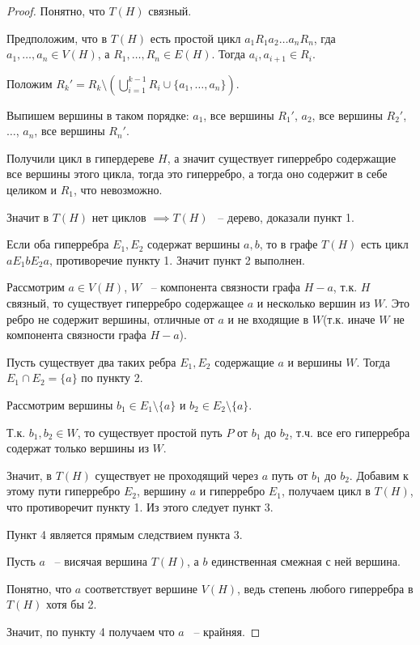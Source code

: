 \documentclass[../main.tex]{subfiles}
\begin{document}
\begin{proof}
	Понятно, что $T(H)$ связный.

	Предположим, что в $T(H)$ есть простой цикл $a_1 R_1 a_2 \ldots a_n R_n$, гда $a_1, \ldots, a_n \in V(H)$, а $R_1, \ldots, R_n \in E(H)$.
	Тогда $a_i, a_{i + 1} \in R_i$.

	Положим  $R_k' = R_k \setminus\left(\bigcup_{i = 1}^{k - 1} R_i \cup \{a_1, \ldots, a_n\}\right)$.

	Выпишем вершины в таком порядке: $a_1$, все вершины $R_1'$,  $a_2$, все вершины $R_2'$,  $\dots$,  $a_n$, все вершины  $R_n'$.

	Получили цикл в гипердереве  $H$, а значит существует гиперребро содержащие все вершины этого цикла, тогда это гиперребро, а тогда оно содержит в себе целиком и $R_1$, что невозможно.

	Значит в  $T(H)$ нет циклов  $\implies T(H)$ ~-- дерево, доказали пункт 1.

	Если оба гиперребра  $E_1, E_2$ содержат вершины $a, b$, то в графе  $T(H)$ есть цикл  $a E_1 b E_2 a$, противоречие пункту 1. Значит пункт 2 выполнен.

	Рассмотрим $a \in V(H)$, $W$ ~-- компонента связности графа $H - a$, т.к. $H$ связный, то существует гиперребро содержащее $a$ и несколько вершин из $W$.
	Это ребро не содержит вершины, отличные от $a$ и не входящие в $W$(т.к. иначе $W$ не компонента связности графа $H - a$).

	Пусть существует два таких ребра $E_1, E_2$ содержащие $a$ и вершины $W$.
	Тогда  $E_1 \cap E_2 = \{a\}$ по пункту 2.

	Рассмотрим вершины $b_1 \in E_1 \setminus \{a\}$ и $b_2 \in E_2 \setminus \{a\}$.

	Т.к. $b_1, b_2 \in W$, то существует простой путь $P$ от $b_1$ до $b_2$, т.ч. все его гиперребра содержат только вершины из $W$.

	Значит, в $T(H)$ существует не проходящий через  $a$ путь от $b_1$ до $b_2$.
	Добавим к этому пути гиперребро $E_2$, вершину $a$ и гиперребро  $E_1$, получаем цикл в  $T(H)$, что противоречит пункту 1.
	Из этого следует пункт 3.

	Пункт 4 является прямым следствием пункта 3.

	Пусть  $a$ ~-- висячая вершина  $T(H)$, а $b$ единственная смежная с ней вершина.

	Понятно, что $a$ соответствует вершине $V(H)$, ведь степень любого гиперребра в $T(H)$ хотя бы 2.

	Значит, по пункту 4 получаем что  $a$ ~-- крайняя.


\end{proof}
\end{document}
